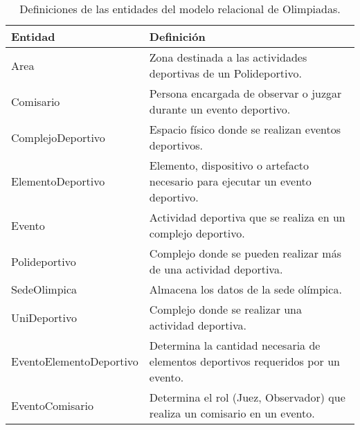 \begin{table}[H]
\centering
\caption{Definiciones de las entidades del modelo relacional de Olimpiadas.}
\renewcommand{\arraystretch}{1.5}%
\label{tab-DiccR-1a}
\begin{tabular}{@{}ll@{}}
\toprule
\textbf{Entidad}  & \textbf{Definición}\\ \midrule
Area    & Zona destinada a las actividades deportivas de un Polideportivo. \\
Comisario  & Persona encargada de observar o juzgar durante un evento deportivo.\\
ComplejoDeportivo & Espacio físico donde se realizan eventos deportivos.\\
ElementoDeportivo & Elemento, dispositivo o artefacto necesario para ejecutar un evento deportivo.\\
Evento & Actividad deportiva que se realiza en un complejo deportivo.\\
Polideportivo & Complejo donde se pueden realizar más de una actividad deportiva.\\
SedeOlimpica & Almacena los datos de la sede olímpica.\\
UniDeportivo & Complejo donde se realizar una actividad deportiva.\\ 
EventoElementoDeportivo & Determina la cantidad necesaria de elementos deportivos requeridos por un evento. \\
EventoComisario & Determina el rol (Juez, Observador) que realiza un comisario en un evento. \\
\bottomrule
\end{tabular}
\end{table}

